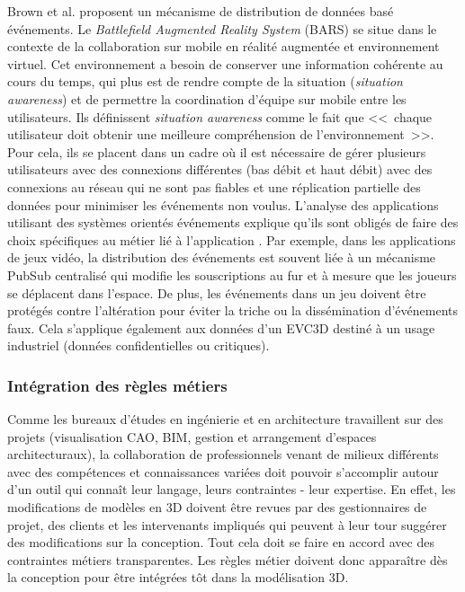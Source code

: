 Brown et al. \cite{Brown2003} proposent un mécanisme de distribution de 
données basé événements. Le \textit{Battlefield Augmented Reality System} 
(BARS) se situe dans le contexte de la collaboration sur mobile en réalité 
augmentée et environnement virtuel. Cet environnement a besoin de conserver 
une information cohérente au cours du temps, qui plus est de rendre compte de la 
situation (\textit{situation awareness}) et de permettre la coordination d'équipe sur 
mobile entre les utilisateurs. Ils définissent \textit{situation awareness} comme le 
fait que <<~chaque utilisateur doit obtenir une meilleure compréhension de 
l'environnement~>>. Pour cela, ils se placent dans un cadre où il est nécessaire 
de gérer plusieurs utilisateurs avec des connexions différentes (bas débit et haut 
débit) avec des connexions au réseau qui ne sont pas fiables et une réplication 
partielle des données pour minimiser les événements non voulus. L'analyse des applications utilisant des 
systèmes orientés événements explique 
qu'ils sont obligés de faire des choix spécifiques au métier lié à l'application 
\cite{Hinze2009}. Par exemple, dans les applications de jeux vidéo, la distribution 
des événements est souvent liée à un mécanisme \gls{PubSub} centralisé qui 
modifie les souscriptions au fur et à mesure que les joueurs se déplacent dans 
l'espace. De plus, les événements dans un jeu doivent être protégés contre 
l'altération pour éviter la triche ou la dissémination d'événements faux. Cela 
s'applique également aux données d'un \gls{EVC3D} destiné à un usage industriel 
(données confidentielles ou critiques).

\subsubsection{Intégration des règles métiers}
Comme les bureaux d'études en ingénierie et en architecture travaillent sur des 
projets (visualisation \gls{CAO}, \gls{BIM}, gestion et arrangement d'espaces 
architecturaux), la collaboration de professionnels venant de milieux différents 
avec des compétences et connaissances variées doit pouvoir s'accomplir autour d'un 
outil qui connaît leur langage, leurs contraintes - leur expertise. En effet, les 
modifications de modèles en \gls{3D} doivent être revues par des gestionnaires de 
projet, des clients et les intervenants impliqués qui peuvent à leur tour suggérer 
des modifications sur la conception. Tout cela doit se faire en accord avec des 
contraintes métiers transparentes.
Les règles métier doivent donc apparaître dès la conception pour être 
intégrées tôt dans la modélisation \gls{3D}. 

